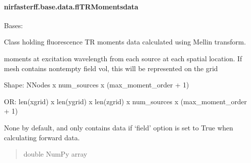 \documentclass[letterpaper,10pt,english]{sphinxmanual}
\begin{document}
\paragraph{nirfasterff.base.data.flTRMomentsdata}
\label{\detokenize{_autosummary/nirfasterff.base.data.flTRMomentsdata:nirfasterff-base-data-fltrmomentsdata}}\label{\detokenize{_autosummary/nirfasterff.base.data.flTRMomentsdata::doc}}

\begin{fulllineitems}
\label{\detokenize{_autosummary/nirfasterff.base.data.flTRMomentsdata:nirfasterff.base.data.flTRMomentsdata}}
\pysigstartsignatures
\pysigline
{}
\pysigstopsignatures
\sphinxAtStartPar
Bases: 

\sphinxAtStartPar
Class holding fluorescence TR moments data calculated using Mellin transform.

\begin{fulllineitems}
\label{\detokenize{_autosummary/nirfasterff.base.data.flTRMomentsdata:nirfasterff.base.data.flTRMomentsdata.phix}}
\pysigstartsignatures
\pysigline
{}
\pysigstopsignatures
\sphinxAtStartPar
moments at excitation wavelength from each source at each spatial location. If mesh contains non\sphinxhyphen{}tempty field vol, this will be represented on the grid

\sphinxAtStartPar
Shape: NNodes x num\_sources x (max\_moment\_order + 1)

\sphinxAtStartPar
OR: len(xgrid) x len(ygrid) x len(zgrid) x num\_sources x (max\_moment\_order + 1)

\sphinxAtStartPar
None by default, and only contains data if ‘field’ option is set to True when calculating forward data.
\begin{quote}\begin{description}
\sphinxAtStartPar
double NumPy array

\end{description}\end{quote}

\end{fulllineitems}


\end{fulllineitems}
\end{document}
